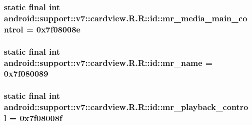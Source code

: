 \hypertarget{classandroid_1_1support_1_1v7_1_1cardview_1_1_r_1_1id_f03e9ff5175cf81238fa05858556ba0a}{
\subsubsection[{mr\_\-media\_\-main\_\-control}]{\setlength{\rightskip}{0pt plus 5cm}static final int android::support::v7::cardview.R.R::id::mr\_\-media\_\-main\_\-control = 0x7f08008e}}
\label{classandroid_1_1support_1_1v7_1_1cardview_1_1_r_1_1id_f03e9ff5175cf81238fa05858556ba0a}


\hypertarget{classandroid_1_1support_1_1v7_1_1cardview_1_1_r_1_1id_6e07da9b26c9f78c3fcd53bfe459cae1}{
\subsubsection[{mr\_\-name}]{\setlength{\rightskip}{0pt plus 5cm}static final int android::support::v7::cardview.R.R::id::mr\_\-name = 0x7f080089}}
\label{classandroid_1_1support_1_1v7_1_1cardview_1_1_r_1_1id_6e07da9b26c9f78c3fcd53bfe459cae1}


\hypertarget{classandroid_1_1support_1_1v7_1_1cardview_1_1_r_1_1id_9830a87f2ed62ae000a2fa862a987409}{
\subsubsection[{mr\_\-playback\_\-control}]{\setlength{\rightskip}{0pt plus 5cm}static final int android::support::v7::cardview.R.R::id::mr\_\-playback\_\-control = 0x7f08008f}}
\label{classandroid_1_1support_1_1v7_1_1cardview_1_1_r_1_1id_9830a87f2ed62ae000a2fa862a987409}


